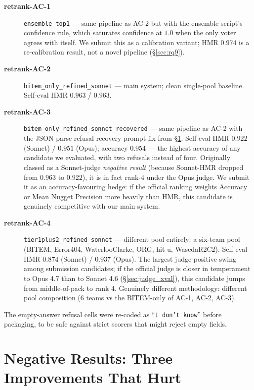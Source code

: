 \documentclass[11pt,a4paper]{article}
\begin{document}
\begin{description}
  \item[\textbf{retrank-AC-1}] \texttt{ensemble\_top1} — same
    pipeline as AC-2 but with the ensemble script's confidence rule,
    which saturates confidence at $1.0$ when the only voter agrees
    with itself. We submit this as a calibration variant; HMR $0.974$
    is a re-calibration result, not a novel pipeline
    (\S\ref{sec:rq9}).
  \item[\textbf{retrank-AC-2}] \texttt{bitem\_only\_refined\_sonnet}
    — main system; clean single-pool baseline. Self-eval HMR
    $0.963$ / $0.963$.
  \item[\textbf{retrank-AC-3}] \texttt{bitem\_only\_refined\_sonnet\_recovered}
    — same pipeline as AC-2 with the JSON-parse refusal-recovery
    prompt fix from \S\ref{sec:negative}. Self-eval HMR $0.922$
    (Sonnet) / $\mathbf{0.951}$ (Opus); accuracy $\mathbf{0.954}$
    --- the highest accuracy of any candidate we evaluated, with two
    refusals instead of four. Originally classed as a Sonnet-judge
    \emph{negative result} (because Sonnet-HMR dropped from $0.963$
    to $0.922$), it is in fact rank-4 under the Opus judge. We
    submit it as an accuracy-favouring hedge: if the official
    ranking weights Accuracy or Mean Nugget Precision more heavily
    than HMR, this candidate is genuinely competitive with our
    main system.
  \item[\textbf{retrank-AC-4}] \texttt{tier1plus2\_refined\_sonnet}
    — different pool entirely: a six-team pool (BITEM, Error404,
    WaterlooClarke, ORG, hit-u, WasedaR2C2). Self-eval HMR $0.874$
    (Sonnet) / $\mathbf{0.937}$ (Opus). The largest judge-positive
    swing among submission candidates; if the official judge is
    closer in temperament to Opus 4.7 than to Sonnet 4.6
    (\S\ref{sec:judge_xval}), this candidate jumps from
    middle-of-pack to rank 4. Genuinely different methodology:
    different pool composition (6 teams vs the BITEM-only of AC-1,
    AC-2, AC-3).
\end{description}

\noindent The empty-answer refusal cells were re-coded as
``\texttt{I don't know}'' before packaging, to be safe against
strict scorers that might reject empty fields.

\section{Negative Results: Three Improvements That Hurt}\label{sec:negative}
\end{document}
